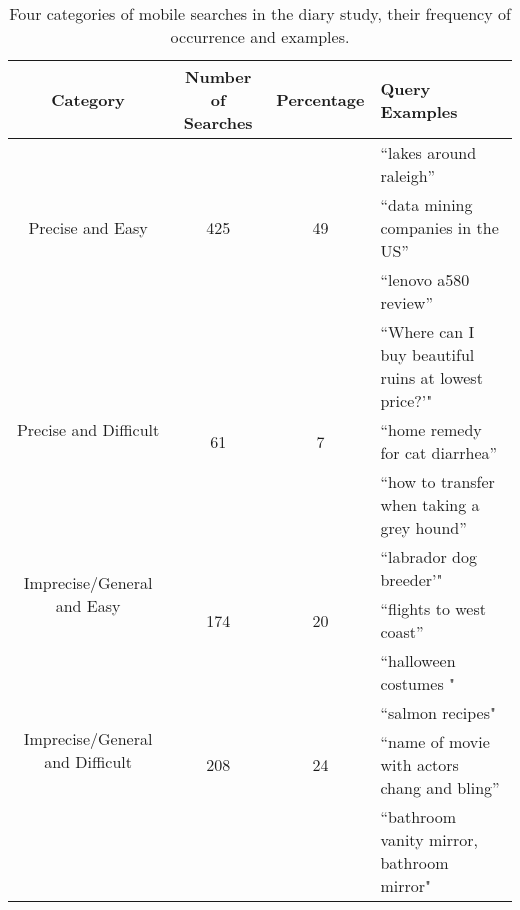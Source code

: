 



\begin{table*}[ht]
\begin{center}
    \begin{tabular}{ | c | c | c | l |}
    \hline
    Category &  Number of Searches & Percentage & Query Examples \\ \hline
   \multirow{3}{*}{Precise and Easy} & & &  ``lakes around raleigh'' \\
    					   & 425 & 49 & ``data mining companies in the US''\\ 				
					   & &  &  ``lenovo a580 review''  \\ \hline 
					   
   \multirow{3}{*}{Precise and Difficult} & & & ``Where can I buy beautiful ruins at lowest price?'"\\
    					   & 61 & 7 & ``home remedy for cat diarrhea''\\ 				
					   & &  & ``how to transfer when taking a grey hound''  \\ \hline 

   \multirow{2}{*}{ Imprecise/General and Easy} & & & ``labrador dog breeder'"\\
    					   & 174 & 20 & ``flights to west coast''\\
					   & & & ``halloween costumes "\\ \hline 

   \multirow{2}{*}{ Imprecise/General and Difficult} & & & ``salmon recipes"\\
    					   & 208 & 24 & ``name of movie with actors chang and bling''\\
					   & & & ``bathroom vanity mirror, bathroom mirror"\\ \hline 

   
 \end{tabular}
\end{center}
\label{searchcategories}
\caption{Four categories of mobile searches in the diary study, their frequency of occurrence and examples.}
\end{table*}

